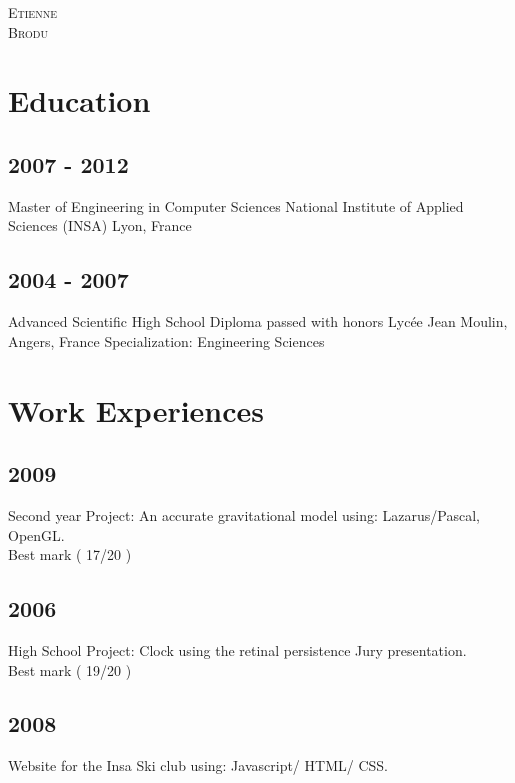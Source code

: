 


\pagestyle{empty}

	{
		\LARGE{\textsc{Etienne}\\
				\textsc{Brodu}}
	}
	
\section{Education}
\subsection{2007 - 2012}
			{Master of Engineering in Computer Sciences National Institute of Applied Sciences (INSA) Lyon, France}\\

\subsection{2004 - 2007}
			{Advanced Scientific High School Diploma passed with honors Lyc\'{e}e Jean Moulin, Angers, France Specialization: Engineering Sciences}

\section{Work Experiences}
\subsection{2009}
			{Second year Project: An accurate gravitational model using: Lazarus/Pascal, OpenGL.\\ Best mark ( 17/20 )}
\subsection{2006}
			{High School Project: Clock using the retinal persistence Jury presentation.\\ Best mark ( 19/20 )}

\subsection{2008}
			{Website for the Insa Ski club using: Javascript/ HTML/ CSS.}
			
